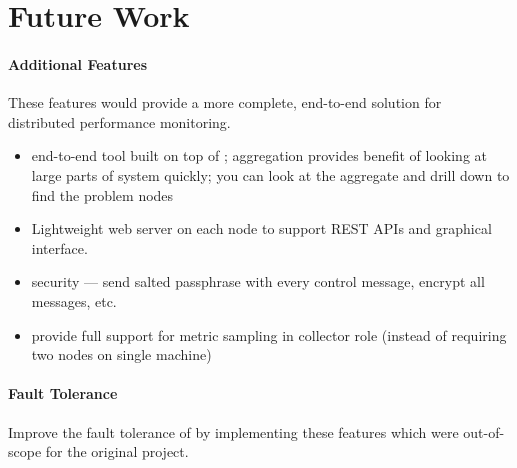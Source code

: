 \chapter{Future Work}
\label{future_work}

\subsubsection{Additional Features}

These features would provide a more complete, end-to-end solution for distributed performance monitoring.

\begin{itemize}

\item end-to-end tool built on top of \dcamp; aggregation provides benefit of looking at large parts of system quickly;
you can look at the aggregate and drill down to find the problem nodes

\item Lightweight web server on each node to support REST APIs and graphical interface.

\item security --- send salted passphrase with every control message, encrypt all messages, etc.

\item provide full support for metric sampling in collector role (instead of requiring two nodes on single machine)

\end{itemize}

\subsubsection{Fault Tolerance}

Improve the fault tolerance of \dcamp by implementing these features which were out-of-scope for the original project.

